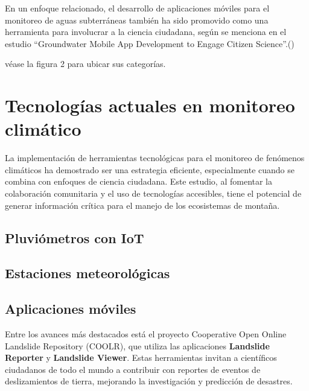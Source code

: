 En un enfoque relacionado, el desarrollo de aplicaciones móviles para el monitoreo de aguas subterráneas también ha sido promovido como una herramienta para involucrar a la ciencia ciudadana, según se menciona en el estudio “Groundwater Mobile App Development to Engage Citizen Science”.(\cite{dennis2019groundwater})



véase la figura 2 para ubicar sus categorías.














\section{Tecnologías actuales en monitoreo climático}
La implementación de herramientas tecnológicas para el monitoreo de fenómenos climáticos ha demostrado ser una estrategia eficiente, especialmente cuando se combina con enfoques de ciencia ciudadana. Este estudio, al fomentar la colaboración comunitaria y el uso de tecnologías accesibles, tiene el potencial de generar información crítica para el manejo de los ecosistemas de montaña.

\subsection{Pluviómetros con IoT}

\subsection{Estaciones meteorológicas}














\subsection{Aplicaciones móviles}

Entre los avances más destacados está el proyecto Cooperative Open Online Landslide Repository (COOLR), que utiliza las aplicaciones \textbf{Landslide Reporter} y \textbf{Landslide Viewer}. Estas herramientas invitan a científicos ciudadanos de todo el mundo a contribuir con reportes de eventos de deslizamientos de tierra, mejorando la investigación y predicción de desastres.\cite{coolr2021} 

